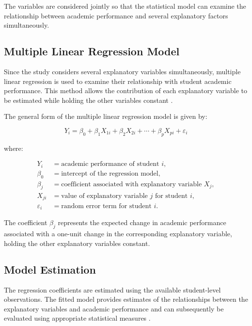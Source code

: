 The variables are considered jointly so that the statistical model can examine the relationship between academic performance and several explanatory factors simultaneously.

\subsection{Multiple Linear Regression Model}

Since the study considers several explanatory variables simultaneously, multiple linear regression is used to examine their relationship with student academic performance. This method allows the contribution of each explanatory variable to be estimated while holding the other variables constant \citep{yang2018predicting}.

The general form of the multiple linear regression model is given by:

\begin{equation}
Y_i = \beta_0 + \beta_1 X_{1i} + \beta_2 X_{2i} + \cdots + \beta_p X_{pi} + \varepsilon_i
\end{equation}

where:

\begin{align*}
Y_i & = \text{academic performance of student } i, \\
\beta_0 & = \text{intercept of the regression model}, \\
\beta_j & = \text{coefficient associated with explanatory variable } X_j, \\
X_{ji} & = \text{value of explanatory variable } j \text{ for student } i, \\
\varepsilon_i & = \text{random error term for student } i.
\end{align*}

The coefficient $\beta_j$ represents the expected change in academic performance associated with a one-unit change in the corresponding explanatory variable, holding the other explanatory variables constant.

\subsection{Model Estimation}

The regression coefficients are estimated using the available student-level observations. The fitted model provides estimates of the relationships between the explanatory variables and academic performance and can subsequently be evaluated using appropriate statistical measures \citep{yang2018predicting}.

